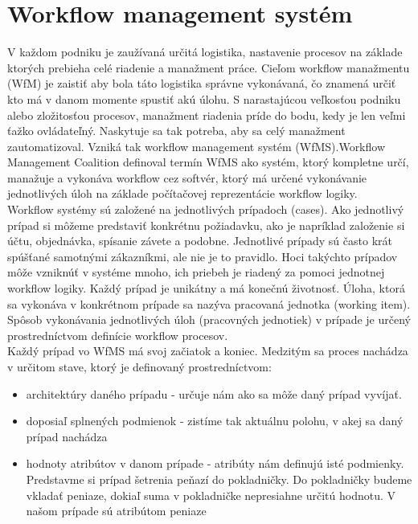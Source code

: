 
\section{Workflow management systém}
V každom podniku je zaužívaná určitá logistika, nastavenie procesov na základe ktorých prebieha celé riadenie a manažment práce. Cieľom workflow manažmentu (WfM) je zaistiť aby bola táto logistika správne vykonávaná, čo znamená určiť kto má v danom momente spustiť akú úlohu. S narastajúcou veľkosťou podniku alebo zložitosťou procesov, manažment riadenia príde do bodu, kedy je len veľmi ťažko ovládateľný. Naskytuje sa tak potreba, aby sa celý manažment zautomatizoval. Vzniká tak workflow management systém (WfMS).Workflow Management Coalition definoval termín WfMS ako systém, ktorý kompletne určí, manažuje a vykonáva workflow cez softvér, ktorý má určené vykonávanie jednotlivých úloh na základe počítačovej reprezentácie workflow logiky. \cite{aalst}\\



Workflow systémy sú založené na jednotlivých prípadoch (cases). Ako jednotlivý prípad si môžeme predstaviť konkrétnu požiadavku, ako je napríklad založenie si účtu, objednávka, spísanie závete a podobne. Jednotlivé prípady sú často krát spúšťané samotnými zákazníkmi, ale nie je to pravidlo. Hoci takýchto prípadov môže vzniknúť v systéme mnoho, ich priebeh je riadený za pomoci jednotnej workflow logiky. Každý prípad je unikátny a má konečnú životnosť.  Úloha, ktorá sa vykonáva v konkrétnom prípade sa nazýva pracovaná jednotka (working item).
Spôsob vykonávania jednotlivých úloh (pracovných jednotiek) v prípade  je určený prostredníctvom definície workflow procesov. \cite{aalst}  \\	 



Každý prípad vo WfMS má svoj začiatok a koniec. Medzitým sa proces nachádza v určitom stave, ktorý je definovaný prostredníctvom:
\begin{itemize}
	\item architektúry daného prípadu - určuje nám ako sa môže daný prípad vyvíjať. 
	\item doposiaľ splnených podmienok - zistíme tak aktuálnu \glqq polohu\grqq, v akej sa daný prípad nachádza 
	\item hodnoty atribútov v danom prípade - atribúty nám definujú isté podmienky. Predstavme si prípad šetrenia peňazí do pokladničky. Do pokladničky budeme vkladať peniaze, dokiaľ suma v pokladničke nepresiahne určitú hodnotu. V našom prípade sú atribútom peniaze
\end{itemize}

